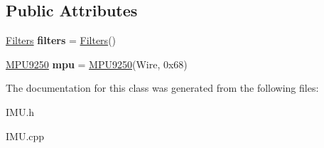 \subsection*{Public Attributes}
\begin{DoxyCompactItemize}
\item 
\mbox{\label{class_i_m_u_ac7b2db5d2aa9f69912509fadec1a6144}} 
\hyperlink{class_filters}{Filters} {\bfseries filters} = \hyperlink{class_filters}{Filters}()
\item 
\mbox{\label{class_i_m_u_a87ff319ad7422f7c4008c5c3a22c5ac0}} 
\hyperlink{class_m_p_u9250}{M\+P\+U9250} {\bfseries mpu} = \hyperlink{class_m_p_u9250}{M\+P\+U9250}(Wire, 0x68)
\end{DoxyCompactItemize}


The documentation for this class was generated from the following files\+:\begin{DoxyCompactItemize}
\item 
I\+M\+U.\+h\item 
I\+M\+U.\+cpp\end{DoxyCompactItemize}
